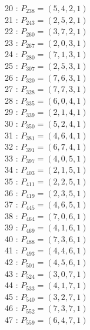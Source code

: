 \documentclass{article}
\begin{document}
{\begin{multicols}{2}
20 : $P_{238}=( 5, 4, 2, 1 )$\\
21 : $P_{243}=( 2, 5, 2, 1 )$\\
22 : $P_{260}=( 3, 7, 2, 1 )$\\
23 : $P_{267}=( 2, 0, 3, 1 )$\\
24 : $P_{280}=( 7, 1, 3, 1 )$\\
25 : $P_{307}=( 2, 5, 3, 1 )$\\
26 : $P_{320}=( 7, 6, 3, 1 )$\\
27 : $P_{328}=( 7, 7, 3, 1 )$\\
28 : $P_{335}=( 6, 0, 4, 1 )$\\
29 : $P_{339}=( 2, 1, 4, 1 )$\\
30 : $P_{350}=( 5, 2, 4, 1 )$\\
31 : $P_{381}=( 4, 6, 4, 1 )$\\
32 : $P_{391}=( 6, 7, 4, 1 )$\\
33 : $P_{397}=( 4, 0, 5, 1 )$\\
34 : $P_{403}=( 2, 1, 5, 1 )$\\
35 : $P_{411}=( 2, 2, 5, 1 )$\\
36 : $P_{419}=( 2, 3, 5, 1 )$\\
37 : $P_{445}=( 4, 6, 5, 1 )$\\
38 : $P_{464}=( 7, 0, 6, 1 )$\\
39 : $P_{469}=( 4, 1, 6, 1 )$\\
40 : $P_{488}=( 7, 3, 6, 1 )$\\
41 : $P_{493}=( 4, 4, 6, 1 )$\\
42 : $P_{501}=( 4, 5, 6, 1 )$\\
43 : $P_{524}=( 3, 0, 7, 1 )$\\
44 : $P_{533}=( 4, 1, 7, 1 )$\\
45 : $P_{540}=( 3, 2, 7, 1 )$\\
46 : $P_{552}=( 7, 3, 7, 1 )$\\
47 : $P_{559}=( 6, 4, 7, 1 )$\\
\end{multicols}
}
\end{document}
